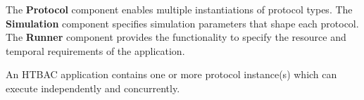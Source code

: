 The \textbf{Protocol} component  enables multiple instantiations of protocol types. 
The \textbf{Simulation} component  specifies simulation parameters that shape 
each protocol. The \textbf{Runner} component provides the functionality to 
specify the resource and temporal requirements of the application.

An HTBAC application contains one or more protocol instance(s) which can execute 
independently and concurrently. 












